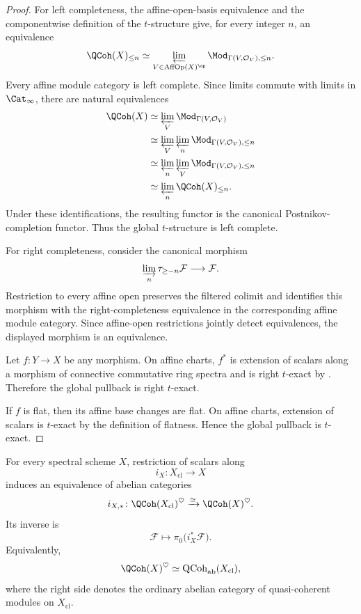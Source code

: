 \begin{proof}
For left completeness, the affine-open-basis equivalence and the
componentwise definition of the $t$-structure give, for every integer
$n$, an equivalence
\[
    \QCoh(X)_{\leq n}
    \simeq
    \varprojlim_
    {V\in\operatorname{AffOp}(X)^{\op}}
    \Mod_{\Gamma(V,\mathcal O_V),\leq n}.
\]
Every affine module category is left complete. Since limits commute with
limits in $\Cat_\infty$, there are natural equivalences
\[
\begin{aligned}
    \QCoh(X)
    &\simeq
    \varprojlim_V
    \Mod_{\Gamma(V,\mathcal O_V)}
    \\
    &\simeq
    \varprojlim_V
    \varprojlim_n
    \Mod_{\Gamma(V,\mathcal O_V),\leq n}
    \\
    &\simeq
    \varprojlim_n
    \varprojlim_V
    \Mod_{\Gamma(V,\mathcal O_V),\leq n}
    \\
    &\simeq
    \varprojlim_n
    \QCoh(X)_{\leq n}.
\end{aligned}
\]
Under these identifications, the resulting functor is the canonical
Postnikov-completion functor. Thus the global $t$-structure is left
complete.

For right completeness, consider the canonical morphism
\[
    \varinjlim_n
    \tau_{\geq-n}\mathcal F
    \longrightarrow
    \mathcal F.
\]
Restriction to every affine open preserves the filtered colimit and
identifies this morphism with the right-completeness equivalence in the
corresponding affine module category. Since affine-open restrictions
jointly detect equivalences, the displayed morphism is an equivalence.

Let $f:Y\to X$ be any morphism. On affine charts, $f^*$ is extension of
scalars along a morphism of connective commutative ring spectra and is
right $t$-exact by
. Therefore the global
pullback is right $t$-exact.

If $f$ is flat, then its affine base changes are flat. On affine charts,
extension of scalars is $t$-exact by the definition of flatness. Hence the
global pullback is $t$-exact.
\end{proof}

\begin{theorem}
\label{thm:qcoh-heart-classical-truncation}
For every spectral scheme $X$, restriction of scalars along
\[
    i_X
    \colon
    X_{\mathrm{cl}}
    \longrightarrow
    X
\]
induces an equivalence of abelian categories
\[
    i_{X,*}
    \colon
    \QCoh(X_{\mathrm{cl}})^\heartsuit
    \xrightarrow{\simeq}
    \QCoh(X)^\heartsuit.
\]
Its inverse is
\[
    \mathcal F
    \longmapsto
    \pi_0\bigl(i_X^*\mathcal F\bigr).
\]
Equivalently,
\[
    \QCoh(X)^\heartsuit
    \simeq
    \operatorname{QCoh}_{\mathrm{ab}}(X_{\mathrm{cl}}),
\]
where the right side denotes the ordinary abelian category of
quasi-coherent modules on $X_{\mathrm{cl}}$.
\end{theorem}

